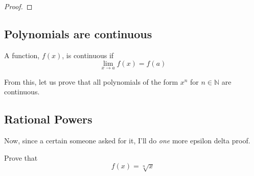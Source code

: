 \begin{proof}

\end{proof}


\subsection{Polynomials are continuous}

A function, $f(x)$, is continuous if \[\lim_{x \to a} f(x) = f(a)\]

From this, let us prove that all polynomials of the form $x^n$ for $n \in \mathbb{N}$ are continuous. 


\subsection{Rational Powers}

Now, since a certain someone asked for it, I'll do \emph{one} more epsilon delta proof.

Prove that 
\[f(x) = \sqrt[n]{x}\] 

